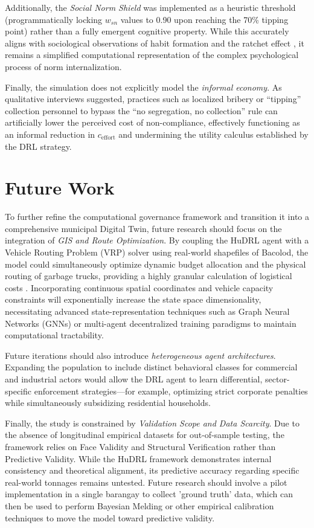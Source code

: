 Additionally, the \textit{Social Norm Shield} was implemented as a heuristic threshold (programmatically locking $w_{sn}$ values to 0.90 upon reaching the 70\% tipping point) rather than a fully emergent cognitive property. While this accurately aligns with sociological observations of habit formation and the ratchet effect \citep{Corcoran2020}, it remains a simplified computational representation of the complex psychological process of norm internalization. 

Finally, the simulation does not explicitly model the \textit{informal economy}. As qualitative interviews suggested, practices such as localized bribery or ``tipping'' collection personnel to bypass the ``no segregation, no collection'' rule can artificially lower the perceived cost of non-compliance, effectively functioning as an informal reduction in $c_{\text{effort}}$ and undermining the utility calculus established by the DRL strategy.

\section{Future Work}

To further refine the computational governance framework and transition it into a comprehensive municipal Digital Twin, future research should focus on the integration of \textit{GIS and Route Optimization}. By coupling the HuDRL agent with a Vehicle Routing Problem (VRP) solver using real-world shapefiles of Bacolod, the model could simultaneously optimize dynamic budget allocation and the physical routing of garbage trucks, providing a highly granular calculation of logistical costs \citep{Torkayesh2021}. Incorporating continuous spatial coordinates and vehicle capacity constraints will exponentially increase the state space dimensionality, necessitating advanced state-representation techniques such as Graph Neural Networks (GNNs) or multi-agent decentralized training paradigms to maintain computational tractability.

Future iterations should also introduce \textit{heterogeneous agent architectures}. Expanding the population to include distinct behavioral classes for commercial and industrial actors would allow the DRL agent to learn differential, sector-specific enforcement strategies—for example, optimizing strict corporate penalties while simultaneously subsidizing residential households.

Finally, the study is constrained by \textit{Validation Scope and Data Scarcity}. Due to the absence of longitudinal empirical datasets for out-of-sample testing, the framework relies on Face Validity and Structural Verification rather than Predictive Validity. While the HuDRL framework demonstrates internal consistency and theoretical alignment, its predictive accuracy regarding specific real-world tonnages remains untested. Future research should involve a pilot implementation in a single barangay to collect 'ground truth' data, which can then be used to perform Bayesian Melding or other empirical calibration techniques to move the model toward predictive validity.

